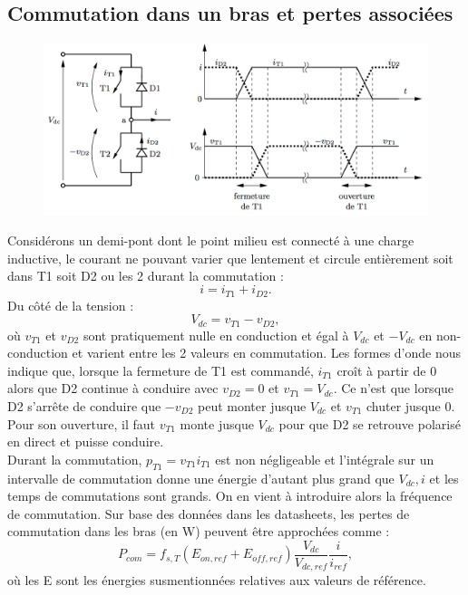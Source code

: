 	\subsection{Commutation dans un bras et pertes associées}
		\begin{figure}
		\vspace{-5mm}
		\includegraphics[scale=0.25]{ch4/10}
		\end{figure}
		Considérons un demi-pont dont le point milieu est connecté à une charge inductive, le courant ne pouvant varier que lentement et circule entièrement soit dans T1 soit D2 ou les 2 durant la commutation : 
		\begin{equation}
			i = i_{T1}+ i_{D2}.
		\end{equation}		 
		Du côté de la tension :
		\begin{equation}
			V_{dc} = v_{T1} - v_{D2},
		\end{equation}
		où $v_{T1}$ et $v_{D2}$ sont pratiquement nulle en conduction et égal à $V_{dc}$ et $-V_{dc}$ en non-conduction et varient entre les 2 valeurs en commutation. Les formes d'onde nous indique que, lorsque la fermeture de T1 est commandé, $i_{T1}$ croît à partir de 0 alors que D2 continue à conduire avec $v_{D2} = 0$ et $v_{T1} = V_{dc}$. Ce n'est que lorsque D2 s'arrête de conduire que $-v_{D2}$ peut monter jusque $V_{dc}$ et $v_{T1}$ chuter jusque 0. Pour son ouverture, il faut $v_{T1}$ monte jusque $V_{dc}$ pour que D2 se retrouve polarisé en direct et puisse conduire. \\
		
		Durant la commutation, $p_{T1} = v_{T1}i_{T1}$ est non négligeable et l'intégrale sur un intervalle de commutation donne une énergie d'autant plus grand que $V_{dc}, i$ et les temps de commutations sont grands. On en vient à introduire alors la fréquence de commutation. Sur base des données dans les datasheets, les pertes de commutation dans les bras (en W) peuvent être approchées comme :
		\begin{equation}
			P_{com} = f_{s,T} (E_{on,ref}+ E_{off,ref})\frac{V_{dc}}{V_{dc,ref}}\frac{i}{i_{ref}},
		\end{equation}
		où les E sont les énergies susmentionnées relatives aux valeurs de référence.
	
